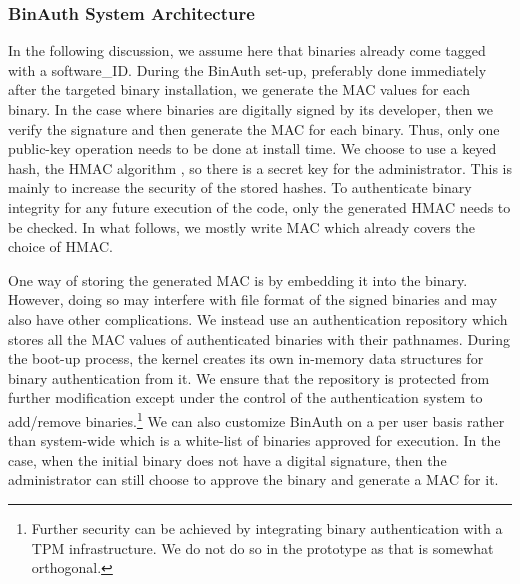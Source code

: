 \subsubsection{BinAuth System Architecture}



In the following discussion, we assume here that binaries already come 
tagged with a software\_ID. 
During the BinAuth set-up, preferably done immediately after 
the targeted binary installation, we generate the MAC values for each binary.
In the case where binaries are digitally signed by its developer,
then we verify the signature and then generate the MAC for each binary.
Thus, only one public-key operation needs to be done at install time.
We choose to use a keyed hash, the HMAC algorithm \cite{krawczyk1997rfc2104},
so there is a secret key for the administrator. This is mainly to increase
the security of the stored hashes.
To authenticate binary integrity for any future execution of the code,
only the generated HMAC needs to be checked.
In what follows, we mostly write MAC which already covers the choice of HMAC.

One way of storing the generated MAC is by embedding it into the binary.
However, doing so may interfere with file format of the signed binaries
and may also have other complications. 
We instead use an authentication repository
which stores all the MAC values of authenticated binaries
with their pathnames.
During the boot-up process, the kernel creates its own in-memory data structures
for binary authentication from it.
We ensure that the repository is protected from further modification
except under the control of the authentication system to 
add/remove binaries.\footnote{
Further security can be achieved by integrating binary authentication
with a TPM infrastructure. We do not do so in the prototype as that is
somewhat orthogonal.
}
We can also customize BinAuth on a per user basis rather
than system-wide which is a white-list of
binaries approved for execution.
In the case, when the initial binary does not have a digital signature, then
the administrator can still choose to approve the binary and generate a MAC
for it.

